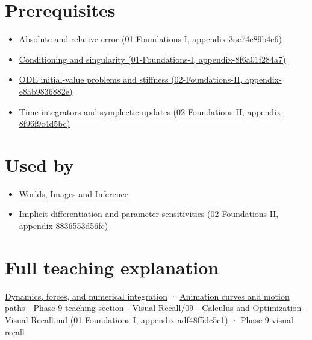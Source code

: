 \section{Prerequisites}\label{appendix-18eacf61a04b-prerequisites}

\begin{itemize}
\tightlist
\item
  \href{../01-Foundations-I/main.pdf\#nameddest=appendix-3ae74e89b4e6}{Absolute and relative error (01-Foundations-I, appendix-3ae74e89b4e6)}
\item
  \href{../01-Foundations-I/main.pdf\#nameddest=appendix-8f6a01f284a7}{Conditioning and singularity (01-Foundations-I, appendix-8f6a01f284a7)}
\item
  \href{../02-Foundations-II/main.pdf\#nameddest=appendix-e8ab9836882e}{ODE initial-value problems and stiffness (02-Foundations-II, appendix-e8ab9836882e)}
\item
  \href{../02-Foundations-II/main.pdf\#nameddest=appendix-8f96f9c4d5bc}{Time integrators and symplectic updates (02-Foundations-II, appendix-8f96f9c4d5bc)}
\end{itemize}

\section{Used by}\label{appendix-18eacf61a04b-used-by}

\begin{itemize}
\tightlist
\item
  \href{Continuous\%20Notes/University\%20-\%20Worlds,\%20Images\%20and\%20Inference\%20-\%20Graphics,\%20Vision\%20and\%20Photography}{Worlds, Images and Inference}
\item
  \href{../02-Foundations-II/main.pdf\#nameddest=appendix-8836553d56fc}{Implicit differentiation and parameter sensitivities (02-Foundations-II, appendix-8836553d56fc)}
\end{itemize}

\section{Full teaching explanation}\label{appendix-18eacf61a04b-full-teaching-explanation}

\href{Continuous\%20Notes/University\%20-\%20Worlds,\%20Images\%20and\%20Inference\%20-\%20Graphics,\%20Vision\%20and\%20Photography\#Dynamics,\%20forces,\%20and\%20numerical\%20integration}{Dynamics, forces, and numerical integration} · \href{Continuous\%20Notes/University\%20-\%20Worlds,\%20Images\%20and\%20Inference\%20-\%20Graphics,\%20Vision\%20and\%20Photography\#Animation\%20curves\%20and\%20motion\%20paths}{Animation curves and motion paths} - \href{Continuous\%20Notes/Computing\%20Foundations\%20-\%20From\%20Bits\%20to\%20C++\%20and\%20Systems\%20APIs\#ODEs\%20and\%20numerical\%20simulation}{Phase 9 teaching section} - \href{../01-Foundations-I/main.pdf\#nameddest=appendix-adf48f5dc5c1}{Visual Recall/09 - Calculus and Optimization - Visual Recall.md (01-Foundations-I, appendix-adf48f5dc5c1)} · Phase 9 visual recall
